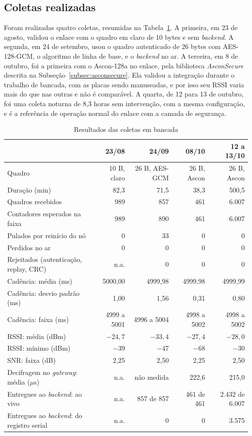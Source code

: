 \subsection{Coletas realizadas}

Foram realizadas quatro coletas, resumidas na Tabela~\ref{tab:coletas}. A primeira, em 23 de agosto, validou o enlace com o quadro em claro de 10 bytes e sem \textit{backend}. A segunda, em 24 de setembro, usou o quadro autenticado de 26 bytes com AES-128-GCM, o algoritmo de linha de base, e o \textit{backend} no ar. A terceira, em 8 de outubro, foi a primeira com o Ascon-128a no enlace, pela biblioteca \textit{AsconSecure} descrita na Subseção~\ref{subsec:asconsecure}. Ela validou a integração durante o trabalho de bancada, com as placas sendo manuseadas, e por isso seu RSSI varia mais do que nas outras e não é comparável. A quarta, de 12 para 13 de outubro, foi uma coleta noturna de 8,3 horas sem intervenção, com a mesma configuração, e é a referência de operação normal do enlace com a camada de segurança.

\begin{table}[htb]
\centering
\caption{Resultados das coletas em bancada}
\label{tab:coletas}
\footnotesize
\begin{tabular}{p{}rrrr}
\hline
 & \textbf{23/08} & \textbf{24/09} & \textbf{08/10} & \textbf{12 a 13/10} \\
\hline
Quadro & 10 B, claro & 26 B, AES-GCM & 26 B, Ascon & 26 B, Ascon \\
Duração (min) & 82,3 & 71,5 & 38,3 & 500,5 \\
Quadros recebidos & 989 & 857 & 461 & 6.007 \\
Contadores esperados na faixa & 989 & 890 & 461 & 6.007 \\
Pulados por reinício do nó & 0 & 33 & 0 & 0 \\
Perdidos no ar & 0 & 0 & 0 & 0 \\
Rejeitados (autenticação, replay, CRC) & n.a. & 0 & 0 & 0 \\
Cadência: média (ms) & 5000,00 & 4999,98 & 4999,98 & 4999,99 \\
Cadência: desvio padrão (ms) & 1,00 & 1,56 & 0,31 & 0,80 \\
Cadência: faixa (ms) & 4999 a 5001 & 4996 a 5004 & 4998 a 5002 & 4998 a 5002 \\
RSSI: média (dBm) & $-24{,}7$ & $-33{,}4$ & $-27{,}4$ & $-28{,}0$ \\
RSSI: mínimo (dBm) & $-39$ & $-47$ & $-68$ & $-30$ \\
SNR: faixa (dB) & 2,25 & 2,50 & 2,25 & 2,50 \\
Decifragem no \textit{gateway}: média ($\mu$s) & n.a. & não medida & 222,6 & 215,0 \\
Entregues ao \textit{backend}: ao vivo & n.a. & 857 de 857 & 461 de 461 & 2.432 de 6.007 \\
Entregues ao \textit{backend}: do registro serial & n.a. & 0 & 0 & 3.575 \\
\hline
\end{tabular}
\end{table}

